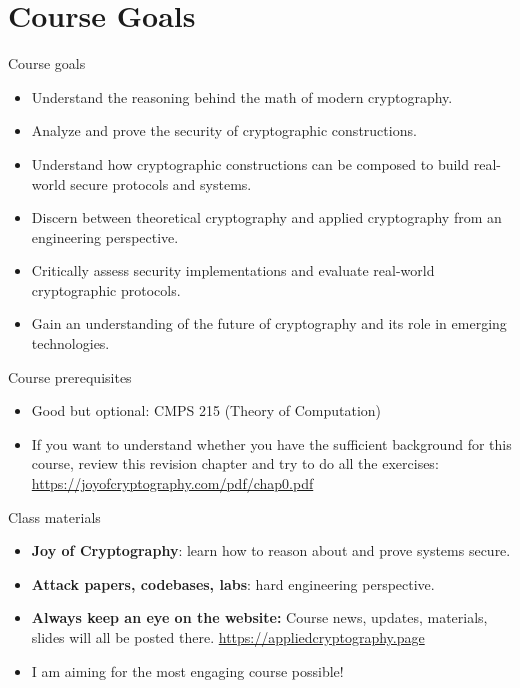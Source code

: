 \documentclass[aspectratio=169, lualatex, handout]{beamer}
\begin{document}
\section{Course Goals}

\begin{frame}{Course goals}
	\begin{itemize}[<+->]
		\item Understand the reasoning behind the math of modern cryptography.
		\item Analyze and prove the security of cryptographic constructions.
		\item Understand how cryptographic constructions can be composed to build real-world
		      secure protocols and systems.
		\item Discern between theoretical cryptography and applied cryptography from
		      an engineering perspective.
		\item Critically assess security implementations and evaluate real-world cryptographic
		      protocols.
		\item Gain an understanding of the future of cryptography and its role in emerging
		      technologies.
	\end{itemize}
\end{frame}

\begin{frame}{Course prerequisites}
	\begin{itemize}
		\item Good but optional: CMPS 215 (Theory of Computation)
		\item If you want to understand whether you have the sufficient background for this course, review this revision chapter and try to do all the exercises: \url{https://joyofcryptography.com/pdf/chap0.pdf}
	\end{itemize}
\end{frame}

\begin{frame}{Class materials}
	\begin{itemize}[<+->]
		\item \textbf{Joy of Cryptography}: learn how to reason about and prove systems secure.
		\item \textbf{Attack papers, codebases, labs}: hard engineering perspective.
		      \vspace{1cm}
		\item \textbf{Always keep an eye on the website:} Course news, updates,
		      materials, slides will all be posted there.
		      \url{https://appliedcryptography.page}
		\item I am aiming for the most engaging course possible!
	\end{itemize}
\end{frame}
\end{document}
